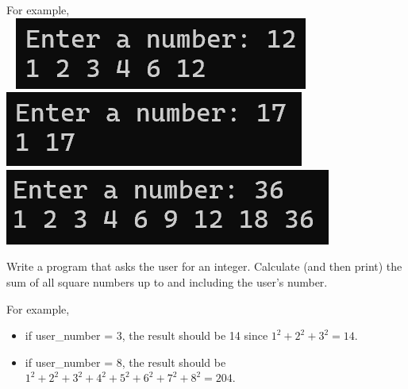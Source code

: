 		For example, \\ \ \hfill
		\includegraphics[height = .35in]{./imgs/factors1.PNG} \hfill  
		\includegraphics[height = .35in]{./imgs/factors2.PNG} \hfill  
		\includegraphics[height = .35in]{./imgs/factors3.PNG} \hfill \


	\item  
		Write a program that asks the user for an integer.  Calculate (and then print) the 
		sum of all square numbers up to and including the user's number.

		For example, 
		\begin{itemize}
			\item if user\_number = 3, the result should be 14 since $1^2 + 2^2 + 3^2 = 14$.
			\item if user\_number = 8, the result should be $1^2+2^2+3^2+4^2+5^2+6^2+7^2+8^2=204$.
		\end{itemize}


